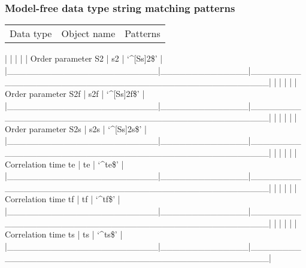 \subsubsection{Model-free data type string matching patterns}



\begin{tabular}{ccc}
Data type & Object name & Patterns \\
\end{tabular}
|                        |              |                                                  |
| Order parameter S2     | s2           | `\^{}[Ss]2\$'                                        |
|\_\_\_\_\_\_\_\_\_\_\_\_\_\_\_\_\_\_\_\_\_\_\_\_|\_\_\_\_\_\_\_\_\_\_\_\_\_\_|\_\_\_\_\_\_\_\_\_\_\_\_\_\_\_\_\_\_\_\_\_\_\_\_\_\_\_\_\_\_\_\_\_\_\_\_\_\_\_\_\_\_\_\_\_\_\_\_\_\_|
|                        |              |                                                  |
| Order parameter S2f    | s2f          | `\^{}[Ss]2f\$'                                       |
|\_\_\_\_\_\_\_\_\_\_\_\_\_\_\_\_\_\_\_\_\_\_\_\_|\_\_\_\_\_\_\_\_\_\_\_\_\_\_|\_\_\_\_\_\_\_\_\_\_\_\_\_\_\_\_\_\_\_\_\_\_\_\_\_\_\_\_\_\_\_\_\_\_\_\_\_\_\_\_\_\_\_\_\_\_\_\_\_\_|
|                        |              |                                                  |
| Order parameter S2s    | s2s          | `\^{}[Ss]2s\$'                                       |
|\_\_\_\_\_\_\_\_\_\_\_\_\_\_\_\_\_\_\_\_\_\_\_\_|\_\_\_\_\_\_\_\_\_\_\_\_\_\_|\_\_\_\_\_\_\_\_\_\_\_\_\_\_\_\_\_\_\_\_\_\_\_\_\_\_\_\_\_\_\_\_\_\_\_\_\_\_\_\_\_\_\_\_\_\_\_\_\_\_|
|                        |              |                                                  |
| Correlation time te    | te           | `\^{}te\$'                                           |
|\_\_\_\_\_\_\_\_\_\_\_\_\_\_\_\_\_\_\_\_\_\_\_\_|\_\_\_\_\_\_\_\_\_\_\_\_\_\_|\_\_\_\_\_\_\_\_\_\_\_\_\_\_\_\_\_\_\_\_\_\_\_\_\_\_\_\_\_\_\_\_\_\_\_\_\_\_\_\_\_\_\_\_\_\_\_\_\_\_|
|                        |              |                                                  |
| Correlation time tf    | tf           | `\^{}tf\$'                                           |
|\_\_\_\_\_\_\_\_\_\_\_\_\_\_\_\_\_\_\_\_\_\_\_\_|\_\_\_\_\_\_\_\_\_\_\_\_\_\_|\_\_\_\_\_\_\_\_\_\_\_\_\_\_\_\_\_\_\_\_\_\_\_\_\_\_\_\_\_\_\_\_\_\_\_\_\_\_\_\_\_\_\_\_\_\_\_\_\_\_|
|                        |              |                                                  |
| Correlation time ts    | ts           | `\^{}ts\$'                                           |
|\_\_\_\_\_\_\_\_\_\_\_\_\_\_\_\_\_\_\_\_\_\_\_\_|\_\_\_\_\_\_\_\_\_\_\_\_\_\_|\_\_\_\_\_\_\_\_\_\_\_\_\_\_\_\_\_\_\_\_\_\_\_\_\_\_\_\_\_\_\_\_\_\_\_\_\_\_\_\_\_\_\_\_\_\_\_\_\_\_|
